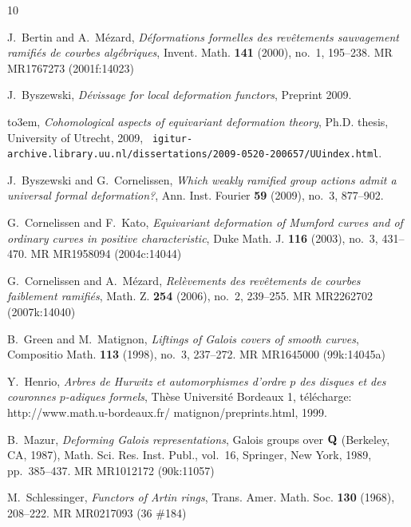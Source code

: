 \documentclass[11pt]{amsart}
\begin{document}
\providecommand{\bysame}{\leavevmode\hbox to3em{\hrulefill}\thinspace}
\providecommand{\MR}{\relax\ifhmode\unskip\space\fi MR }
\providecommand{\MRhref}[2]{%
  \href{http://www.ams.org/mathscinet-getitem?mr=#1}{#2}
}
\providecommand{\href}[2]{#2}
\begin{thebibliography}{10}

J.\ Bertin and A.\ M{\'e}zard, \emph{D\'eformations formelles des
  rev\^etements sauvagement ramifi\'es de courbes alg\'ebriques}, Invent. Math.
  \textbf{141} (2000), no.~1, 195--238. \MR{MR1767273 (2001f:14023)}

J.\ Byszewski, \emph{D\'evissage for local deformation functors}, Preprint
  2009.

\bysame, \emph{Cohomological aspects of equivariant deformation theory}, Ph.D.
  thesis, University of Utrecht, 2009, {\tt
  igitur-archive.library.uu.nl/dissertations/2009-0520-200657/UUindex.html}.

J.\ Byszewski and G.\ Cornelissen, \emph{Which weakly ramified group
  actions admit a universal formal deformation?}, Ann. Inst. Fourier
  \textbf{59} (2009), no.~3, 877--902.

G.\ Cornelissen and F.\ Kato, \emph{Equivariant deformation of
  {M}umford curves and of ordinary curves in positive characteristic}, Duke
  Math. J. \textbf{116} (2003), no.~3, 431--470. \MR{MR1958094 (2004c:14044)}

G.\ Cornelissen and A.\ M{\'e}zard, \emph{Rel\`evements des
  rev\^etements de courbes faiblement ramifi\'es}, Math. Z. \textbf{254}
  (2006), no.~2, 239--255. \MR{MR2262702 (2007k:14040)}

B.\ Green and M.\ Matignon, \emph{Liftings of {G}alois covers of smooth
  curves}, Compositio Math. \textbf{113} (1998), no.~3, 237--272. \MR{MR1645000
  (99k:14045a)}

Y.\ Henrio, \emph{Arbres de {H}urwitz et automorphismes d'ordre $p$ des
  disques et des couronnes $p$-adiques formels}, Th\`ese {U}niversit\'e
  {B}ordeaux 1, t\'el\'echarge: http://www.math.u-bordeaux.fr/\~{
  }matignon/preprints.html, 1999.

B.\ Mazur, \emph{Deforming {G}alois representations}, Galois groups over
  {${\bf Q}$} ({B}erkeley, {CA}, 1987), Math. Sci. Res. Inst. Publ., vol.~16,
  Springer, New York, 1989, pp.~385--437. \MR{MR1012172 (90k:11057)}

M.\ Schlessinger, \emph{Functors of {A}rtin rings}, Trans. Amer. Math. Soc.
  \textbf{130} (1968), 208--222. \MR{MR0217093 (36 \#184)}

\end{thebibliography}
\end{document}
